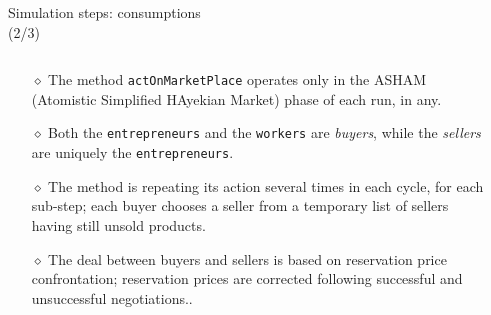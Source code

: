 \documentclass[9pt]{beamer}
\begin{document}
\begin{frame}[fragile]{Simulation steps: consumptions\\(2/3)}

\begin{columns}[T]
\begin{column}{.7\textwidth}
\begin{block}{}


\begin{itemize}

\item[$\diamond$] The method \verb"actOnMarketPlace" operates only in the ASHAM (Atomistic Simplified HAyekian Market) phase of each run, in any.

\item[$\diamond$] Both the \verb|entrepreneurs| and the \verb|workers| are \emph{buyers}, while  the \emph{sellers} are uniquely the  \verb|entrepreneurs|.

\item[$\diamond$] The method is repeating its action several times in each cycle, for each sub-step; each buyer chooses a seller from a temporary list of sellers having still unsold products.

\item[$\diamond$]  The deal between buyers and sellers is based on reservation price confrontation; reservation prices are corrected following successful and unsuccessful negotiations..

\end{itemize}

\end{block}
\end{column}

 \begin{column}{.3\textwidth}
 \vspace{-4.35\baselineskip}
 \begin{block}{}
  \end{block}
  \end{column}
    
\end{columns}

\end{frame}
\end{document}
